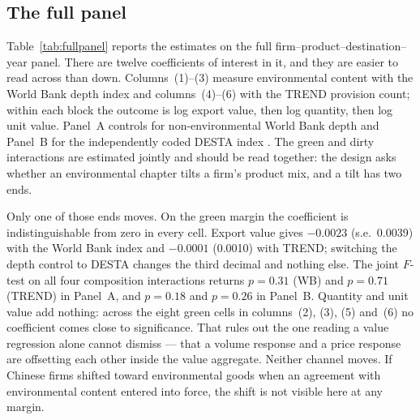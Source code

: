 \documentclass[12pt]{article}
\begin{document}


\FloatBarrier
\subsection{The full panel}\label{sec:fullpanel}

Table~\ref{tab:fullpanel} reports the estimates on the full firm--product--destination--year panel.
There are twelve coefficients of interest in it, and they are easier to read across than down.
Columns~(1)--(3) measure environmental content with the World Bank depth index and columns~(4)--(6)
with the TREND provision count; within each block the outcome is log export value, then log quantity,
then log unit value. Panel~A controls for non-environmental World Bank depth and Panel~B for the
independently coded DESTA index \citep{dur2014}. The green and dirty interactions are estimated
jointly and should be read together: the design asks whether an environmental chapter tilts a firm's
product mix, and a tilt has two ends.

Only one of those ends moves. On the green margin the coefficient is indistinguishable from zero in
every cell. Export value gives $-0.0023$ (s.e.\ 0.0039) with the World Bank index and $-0.0001$
(0.0010) with TREND; switching the depth control to DESTA changes the third decimal and nothing else.
The joint $F$-test on all four composition interactions returns $p = 0.31$ (WB) and $p = 0.71$ (TREND)
in Panel~A, and $p = 0.18$ and $p = 0.26$ in Panel~B. Quantity and unit value add nothing: across the
eight green cells in columns~(2), (3), (5) and~(6) no coefficient comes close to significance. That
rules out the one reading a value regression alone cannot dismiss --- that a volume response and a
price response are offsetting each other inside the value aggregate. Neither channel moves. If
Chinese firms shifted toward environmental goods when an agreement with environmental content entered
into force, the shift is not visible here at any margin.
\end{document}
